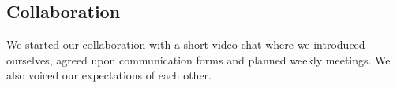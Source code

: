\subsection{Collaboration}
We started our collaboration with a short video-chat where we introduced ourselves, agreed upon communication forms and planned weekly meetings. We also voiced our expectations of each other.



\newpage